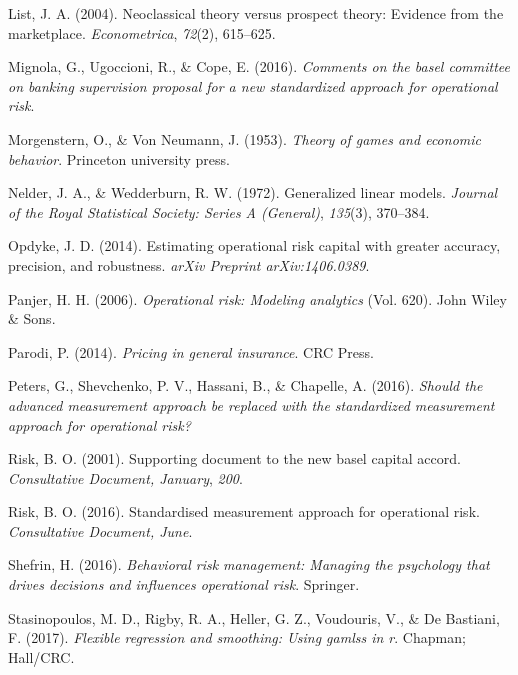 \documentclass{DissertateUSU}
\begin{document}
\leavevmode\hypertarget{ref-list2004neoclassical}{}%
List, J. A. (2004). Neoclassical theory versus prospect theory: Evidence
from the marketplace. \emph{Econometrica}, \emph{72}(2), 615--625.

\leavevmode\hypertarget{ref-mignola2016comments}{}%
Mignola, G., Ugoccioni, R., \& Cope, E. (2016). \emph{Comments on the
basel committee on banking supervision proposal for a new standardized
approach for operational risk}.

\leavevmode\hypertarget{ref-morgenstern1953theory}{}%
Morgenstern, O., \& Von Neumann, J. (1953). \emph{Theory of games and
economic behavior}. Princeton university press.

\leavevmode\hypertarget{ref-nelder1972generalized}{}%
Nelder, J. A., \& Wedderburn, R. W. (1972). Generalized linear models.
\emph{Journal of the Royal Statistical Society: Series A (General)},
\emph{135}(3), 370--384.

\leavevmode\hypertarget{ref-opdyke2014estimating}{}%
Opdyke, J. D. (2014). Estimating operational risk capital with greater
accuracy, precision, and robustness. \emph{arXiv Preprint
arXiv:1406.0389}.

\leavevmode\hypertarget{ref-panjer2006operational}{}%
Panjer, H. H. (2006). \emph{Operational risk: Modeling analytics} (Vol.
620). John Wiley \& Sons.

\leavevmode\hypertarget{ref-parodi2014pricing}{}%
Parodi, P. (2014). \emph{Pricing in general insurance}. CRC Press.

\leavevmode\hypertarget{ref-peters2016should}{}%
Peters, G., Shevchenko, P. V., Hassani, B., \& Chapelle, A. (2016).
\emph{Should the advanced measurement approach be replaced with the
standardized measurement approach for operational risk?}

\leavevmode\hypertarget{ref-risk2001supporting}{}%
Risk, B. O. (2001). Supporting document to the new basel capital accord.
\emph{Consultative Document, January}, \emph{200}.

\leavevmode\hypertarget{ref-risk2016supporting}{}%
Risk, B. O. (2016). Standardised measurement approach for operational
risk. \emph{Consultative Document, June}.

\leavevmode\hypertarget{ref-shefrin2016behavioral}{}%
Shefrin, H. (2016). \emph{Behavioral risk management: Managing the
psychology that drives decisions and influences operational risk}.
Springer.

\leavevmode\hypertarget{ref-stasinopoulos2017flexible}{}%
Stasinopoulos, M. D., Rigby, R. A., Heller, G. Z., Voudouris, V., \& De
Bastiani, F. (2017). \emph{Flexible regression and smoothing: Using
gamlss in r}. Chapman; Hall/CRC.
\end{document}
